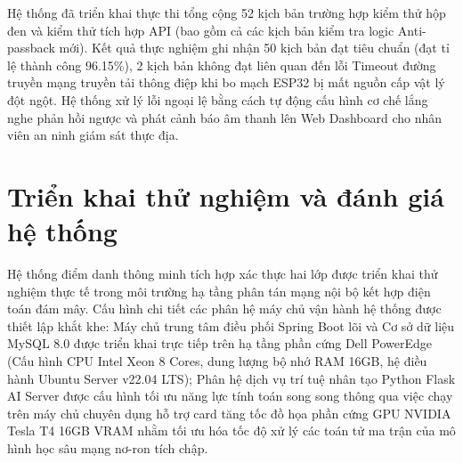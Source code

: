 \documentclass[../DoAn.tex]{subfiles}
\begin{document}
Hệ thống đã triển khai thực thi tổng cộng 52 kịch bản trường hợp kiểm thử hộp đen và kiểm thử tích hợp API (bao gồm cả các kịch bản kiểm tra logic Anti-passback mới). Kết quả thực nghiệm ghi nhận 50 kịch bản đạt tiêu chuẩn (đạt tỉ lệ thành công 96.15\%), 2 kịch bản không đạt liên quan đến lỗi Timeout đường truyền mạng truyền tải thông điệp khi bo mạch ESP32 bị mất nguồn cấp vật lý đột ngột. Hệ thống xử lý lỗi ngoại lệ bằng cách tự động cấu hình cơ chế lắng nghe phản hồi ngược và phát cảnh báo âm thanh lên Web Dashboard cho nhân viên an ninh giám sát thực địa.

\section{Triển khai thử nghiệm và đánh giá hệ thống}
\label{section:4.5}

Hệ thống điểm danh thông minh tích hợp xác thực hai lớp được triển khai thử nghiệm thực tế trong môi trường hạ tầng phân tán mạng nội bộ kết hợp điện toán đám mây. Cấu hình chi tiết các phân hệ máy chủ vận hành hệ thống được thiết lập khắt khe: Máy chủ trung tâm điều phối Spring Boot lõi và Cơ sở dữ liệu MySQL 8.0 được triển khai trực tiếp trên hạ tầng phần cứng Dell PowerEdge (Cấu hình CPU Intel Xeon 8 Cores, dung lượng bộ nhớ RAM 16GB, hệ điều hành Ubuntu Server v22.04 LTS); Phân hệ dịch vụ trí tuệ nhân tạo Python Flask AI Server được cấu hình tối ưu năng lực tính toán song song thông qua việc chạy trên máy chủ chuyên dụng hỗ trợ card tăng tốc đồ họa phần cứng GPU NVIDIA Tesla T4 16GB VRAM nhằm tối ưu hóa tốc độ xử lý các toán tử ma trận của mô hình học sâu mạng nơ-ron tích chập.
\end{document}
